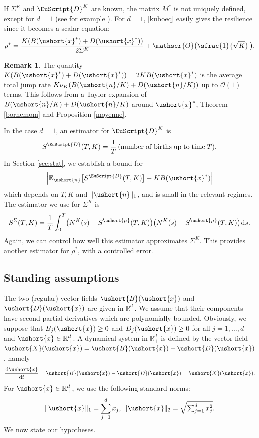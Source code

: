 \documentclass[JEP,XML,SOM,Unicode]{cedram}
\let\mathcal\mathscr
\numberwithin{equation}{section}
\theoremstyle{plain}
\theoremstyle{definition}
\newtheorem{remark}{Remark}[section]
\newcommand{\E}{{\mathbb{E}}}
\newcommand{\rpd}{\mathbb{R}_+^d}
\newcommand{\Oun}{\mathcal{O}(1)}
\newcommand{\sK}{K}
\newcommand{\vecn}{\ushort{n}}
\newcommand{\vecxf}{\ushort{x}^*}
\newcommand{\vecx}{\ushort{x}}
\newcommand{\vecX}{\ushort{X}}
\newcommand{\vecB}{\ushort{B}}
\newcommand{\vecD}{\ushort{D}}
\newcommand{\vmu}{\ushort{\mu}}
\newcommand{\res}{\rho^*}
\newcommand{\nuk}{\nu_{K}}\let\snuk\nuk
\newcommand{\dd}{\hspace{1pt}\mathrm{d}}
\newcommand{\norm}[1]{\|#1\|_{1}}\let\snorm\norm
\newcommand{\normdeux}[1]{\|#1\|_{2}}\let\snormdeux\normdeux
\begin{document}
If $\Sigma^{\sK}$ and $\EuScript{D}^{\sK}$ are known, the matrix $M^*$ is not uniquely defined, except
for $d=1$ (see for example \cite{sim}).
For $d=1$, \eqref{kuboeq} easily gives the resilience since it becomes a scalar equation:
\[
\res = \frac{K(B(\vecxf)+D(\vecxf))}{2 \Sigma^{\sK}} +\mathcal{O}\bigl(\sfrac{1}{\sqrt{K}}\,\bigr).
\]
\begin{remark}
The quantity $K(B(\vecxf)+D(\vecxf)) = 2K B(\vecxf)$ is the average total jump rate $K \nuk(B(\vecn/K) +D(\vecn/K))$ up to $\Oun$ terms.
This follows from a Taylor expansion of $B(\vecn/K) +D(\vecn/K)$ around $\vecxf$, Theorem \ref{bornemom} and Proposition \ref{moyenne}.
\end{remark}
In the case $d=1$, an estimator for $\EuScript{D}^{\sK}$ is
\begin{equation}
\label{stat-D}
S^{{\EuScript{D}}}(T,K)=\frac{1}{T}\,(\mathrm{number\; of \; births\;up\; to\; time}\;T).
\end{equation}
In Section \ref{sec:stat}, we establish a bound for
\[
\left|\E_{\vecn}\bigl[S^{{\EuScript{D}}}(T,K)\bigr]- K B(\vecxf)\right|
\]
which depends on $T, K$ and $\norm{\vecn}$, and is small in the relevant regimes.
The estimator we use for $\Sigma^{\sK}$ is
\begin{equation}
\label{stat-MSigma}
S^{\Sigma}(T,K)=
\frac{1}{T}\int_{0}^{T}\bigl(N^{\sK}(s)-S^{\vmu}(T,K)\bigr)\bigl(N^{\sK}(s)-S^{\vmu}(T,K)\bigr)\dd s.
\end{equation}
Again, we can control how well this estimator approximates $\Sigma^{\sK}$. This provides another estimator for $\rho^*$, with a controlled error.

\subsection{Standing assumptions}\label{hypo}

The two (regular) vector fields $\vecB(\vecx)$ and $\vecD(\vecx)$ are given in $\rpd$.
We assume that their components have second partial derivatives which are polynomially bounded.
Obviously, we suppose that $B_j(\vecx)\geq 0$ and $D_j(\vecx)\geq 0$ for all $j=1,\ldots,d$ and $\vecx\in\rpd$.
A dynamical system in $\rpd$ is defined by the vector field $\vecX(\vecx)=\vecB(\vecx)-\vecD(\vecx)$, namely
\[
\frac{\dd \vecx}{\dd t}=\vecB(\vecx)-\vecD(\vecx)=\vecX(\vecx).
\]
For $\vecx\in \rpd$, we use the following standard norms:
\[
\norm{\vecx}=\sum_{j=1}^{d}x_{j}, \;
\normdeux{\vecx}=\sqrt{\textstyle\sum_{j=1}^{d} x_{j}^2}.
\]
We now state our hypotheses.
\end{document}
